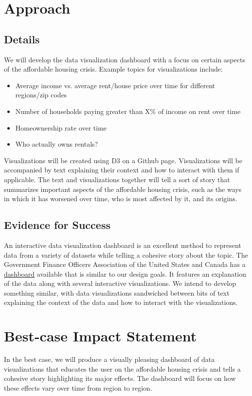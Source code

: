 \documentclass{proc}
\begin{document}
\section{Approach}
\subsection{Details}
We will develop the data visualization dashboard with a focus on certain aspects of the affordable housing crisis. Example topics for visualizations include:
\begin{itemize}
    \item Average income vs. average rent/house price over time for different regions/zip codes 
    \item Number of households paying greater than X\% of income on rent over time
    \item Homeownership rate over time
    \item Who actually owns rentals?
\end{itemize}
Visualizations will be created using D3 on a Github page. Visualizations will be accompanied by text explaining their context and how to interact with them if applicable. The text and visualizations together will tell a sort of story that summarizes important aspects of the affordable housing crisis, such as the ways in which it has worsened over time, who is most affected by it, and its origins.

\subsection{Evidence for Success}
An interactive data visualization dashboard is an excellent method to represent data from a variety of datasets while telling a cohesive story about the topic. The Government Finance Officers Association of the United States and Canada has a \href{https://www.gfoa.org/dashboard---housing-data}{dashboard} available that is similar to our design goals. It features an explanation of the data along with several interactive visualizations. We intend to develop something similar, with data visualizations sandwiched between bits of text explaining the context of the data and how to interact with the visualizations. 

\section{Best-case Impact Statement}
In the best case, we will produce a visually pleasing dashboard of data visualizations that educates the user on the affordable housing crisis and tells a cohesive story highlighting its major effects. The dashboard will focus on how these effects vary over time from region to region.
\end{document}

